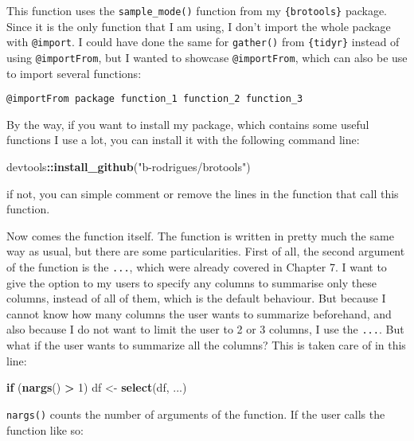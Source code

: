 \documentclass[
]{article}
\newenvironment{Shaded}{\begin{snugshade}}{\end{snugshade}}
\newcommand{\ControlFlowTok}[1]{\textcolor[rgb]{0.13,0.29,0.53}{\textbf{#1}}}
\newcommand{\DecValTok}[1]{\textcolor[rgb]{0.00,0.00,0.81}{#1}}
\newcommand{\KeywordTok}[1]{\textcolor[rgb]{0.13,0.29,0.53}{\textbf{#1}}}
\newcommand{\NormalTok}[1]{#1}
\newcommand{\OperatorTok}[1]{\textcolor[rgb]{0.81,0.36,0.00}{\textbf{#1}}}
\newcommand{\StringTok}[1]{\textcolor[rgb]{0.31,0.60,0.02}{#1}}
\begin{document}
This function uses the \texttt{sample\_mode()} function from my \texttt{\{brotools\}} package. Since it is the only
function that I am using, I don't import the whole package with \texttt{@import}. I could have done the
same for \texttt{gather()} from \texttt{\{tidyr\}} instead of using \texttt{@importFrom}, but I wanted to showcase
\texttt{@importFrom}, which can also be use to import several functions:

\begin{verbatim}
@importFrom package function_1 function_2 function_3
\end{verbatim}

By the way, if you want to install my package, which contains some useful functions I use a lot,
you can install it with the following command line:

\begin{Shaded}
\begin{Highlighting}[]
\NormalTok{devtools}\OperatorTok{::}\KeywordTok{install\_github}\NormalTok{(}\StringTok{"b{-}rodrigues/brotools"}\NormalTok{)}
\end{Highlighting}
\end{Shaded}

if not, you can simple comment or remove the lines in the function that call this function.

Now comes the function itself. The function is written in pretty much the same way as usual, but
there are some particularities. First of all, the second argument of the function is the \texttt{...}, which
were already covered in Chapter 7. I want to give the option to my users to specify any columns to
summarise only these columns, instead of all of them, which is the default behaviour. But because
I cannot know how many columns the user wants to summarize beforehand, and also because I do not
want to limit the user to 2 or 3 columns, I use the \texttt{...}.
But what if the user wants to summarize all the columns? This is taken care of in this line:

\begin{Shaded}
\begin{Highlighting}[]
  \ControlFlowTok{if}\NormalTok{ (}\KeywordTok{nargs}\NormalTok{() }\OperatorTok{\textgreater{}}\StringTok{ }\DecValTok{1}\NormalTok{) df \textless{}{-}}\StringTok{ }\KeywordTok{select}\NormalTok{(df, ...)}
\end{Highlighting}
\end{Shaded}

\texttt{nargs()} counts the number of arguments of the function. If the user calls the function like so:
\end{document}
